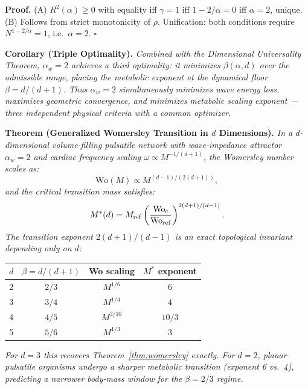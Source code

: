 \documentclass[11pt,a4paper]{article}
\theoremstyle{remark}
\begin{document}
\noindent\textbf{Proof.} (A) $R^2(\alpha) \geq 0$ with equality iff $\gamma = 1$ iff $1-2/\alpha = 0$ iff $\alpha = 2$, unique. (B) Follows from strict monotonicity of $\rho$. Unification: both conditions require $N^{1-2/\alpha} = 1$, i.e.\ $\alpha = 2$. $\square$

\vspace{0.4em}
\noindent\textbf{Corollary (Triple Optimality).} \textit{Combined with the Dimensional Universality Theorem, $\alpha_w = 2$ achieves a third optimality: it minimizes $\beta(\alpha, d)$ over the admissible range, placing the metabolic exponent at the dynamical floor $\beta = d/(d+1)$. Thus $\alpha_w = 2$ simultaneously minimizes wave energy loss, maximizes geometric convergence, and minimizes metabolic scaling exponent --- three independent physical criteria with a common optimizer.}

\vspace{0.8em}
\noindent\textbf{Theorem (Generalized Womersley Transition in $d$ Dimensions).}
\textit{In a $d$-dimensional volume-filling pulsatile network with wave-impedance attractor $\alpha_w = 2$ and cardiac frequency scaling $\omega \propto M^{-1/(d+1)}$, the Womersley number scales as:}
\begin{equation}
\mathrm{Wo}(M) \propto M^{(d-1)/(2(d+1))},
\end{equation}
\textit{and the critical transition mass satisfies:}
\begin{equation}
M^*(d) = M_{\rm ref}\left(\frac{\mathrm{Wo}_c}{\mathrm{Wo}_{\rm
ref}}\right)^{2(d+1)/(d-1)}.
\end{equation}
\textit{The transition exponent $2(d+1)/(d-1)$ is an exact topological invariant depending only on $d$:}

\begin{center}
\small
\begin{tabular}{@{}cccc@{}}
\toprule
$d$ & $\beta = d/(d+1)$ & Wo scaling & $M^*$ exponent \\
\midrule
2 & $2/3$ & $M^{1/6}$ & $6$ \\
3 & $3/4$ & $M^{1/4}$ & $4$ \\
4 & $4/5$ & $M^{3/10}$ & $10/3$ \\
5 & $5/6$ & $M^{1/3}$ & $3$ \\
\bottomrule
\end{tabular}
\end{center}
\textit{For $d=3$ this recovers Theorem~\ref{thm:womersley} exactly. For $d=2$, planar pulsatile organisms undergo a sharper metabolic transition (exponent 6 vs.\ 4), predicting a narrower body-mass window for the $\beta=2/3$ regime.}
\end{document}
